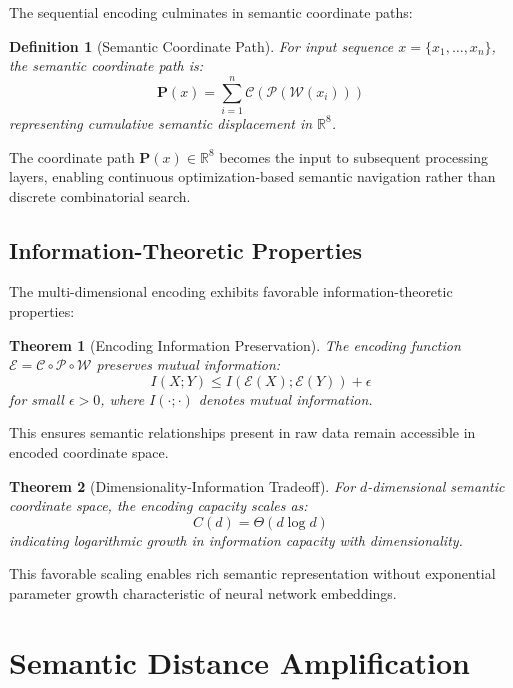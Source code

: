 \documentclass[12pt,a4paper]{article}
\newtheorem{theorem}{Theorem}
\newtheorem{definition}{Definition}
\begin{document}
The sequential encoding culminates in semantic coordinate paths:

\begin{definition}[Semantic Coordinate Path]
For input sequence $x = \{x_1, \ldots, x_n\}$, the semantic coordinate path is:
\begin{equation}
\mathbf{P}(x) = \sum_{i=1}^n \mathcal{C}(\mathcal{P}(\mathcal{W}(x_i)))
\end{equation}
representing cumulative semantic displacement in $\mathbb{R}^8$.
\end{definition}

The coordinate path $\mathbf{P}(x) \in \mathbb{R}^8$ becomes the input to subsequent processing layers, enabling continuous optimization-based semantic navigation rather than discrete combinatorial search.

\subsection{Information-Theoretic Properties}

The multi-dimensional encoding exhibits favorable information-theoretic properties:

\begin{theorem}[Encoding Information Preservation]
The encoding function $\mathcal{E} = \mathcal{C} \circ \mathcal{P} \circ \mathcal{W}$ preserves mutual information:
\begin{equation}
I(X; Y) \leq I(\mathcal{E}(X); \mathcal{E}(Y)) + \epsilon
\end{equation}
for small $\epsilon > 0$, where $I(\cdot;\cdot)$ denotes mutual information.
\end{theorem}

This ensures semantic relationships present in raw data remain accessible in encoded coordinate space.

\begin{theorem}[Dimensionality-Information Tradeoff]
For $d$-dimensional semantic coordinate space, the encoding capacity scales as:
\begin{equation}
C(d) = \Theta(d \log d)
\end{equation}
indicating logarithmic growth in information capacity with dimensionality.
\end{theorem}

This favorable scaling enables rich semantic representation without exponential parameter growth characteristic of neural network embeddings.


\section{Semantic Distance Amplification}
\end{document}
